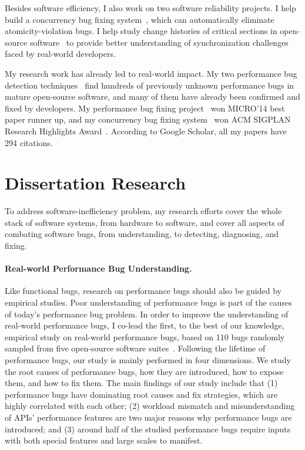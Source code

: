 \documentclass[10pt]{article}
\begin{document}
Besides software efficiency, I also work on two software reliability projects. 
I help build a concurrency bug fixing system~\cite{jin11afix}, which can automatically eliminate atomicity-violation bugs. 
I help study change histories of critical sections in open-source software~\cite{Gu15FSE} 
to provide better understanding of synchronization challenges faced by real-world developers.

My research work has already led to real-world impact. 
My two performance bug detection techniques~\cite{jin12perfbug, Nistor13ICSE} find hundreds of previously unknown performance bugs in mature open-source software, 
and many of them have already been confirmed and fixed by developers. 
My performance bug fixing project~\cite{Song14MICRO} won MICRO'14 best paper runner up, 
and my concurrency bug fixing system~\cite{jin11afix} won ACM SIGPLAN Research Highlights Award~\cite{afixnom}. 
According to Google Scholar, all my papers have 294 citations. 


\section{Dissertation Research}

To address software-inefficiency problem, my research efforts cover the whole stack of software systems, from hardware to software, 
and cover all aspects of combating software bugs, from understanding, to detecting, diagnosing, and fixing. 

\paragraph{Real-world Performance Bug Understanding.}
Like functional bugs, research on performance bugs should also be guided by empirical studies. 
Poor understanding of performance bugs is part of the causes of today's performance bug problem. 
In order to improve the understanding of real-world performance bugs, 
I co-lead the first, to the best of our knowledge, 
empirical study on real-world performance bugs, based on 110 bugs randomly sampled from five open-source software suites~\cite{jin12perfbug}. 
Following the lifetime of performance bugs, 
our study is mainly performed in four dimensions. 
We study the root causes of performance bugs, 
how they are introduced, how to expose them, and how to fix them. 
The main findings of our study include that 
(1) performance bugs have dominating root causes and fix strategies, which are highly correlated with each other; 
(2) workload mismatch and misunderstanding of APIs' performance features are two major reasons why performance bugs are introduced; 
and (3) around half of the studied performance bugs require inputs with both special features and large scales to manifest. 
\end{document}
